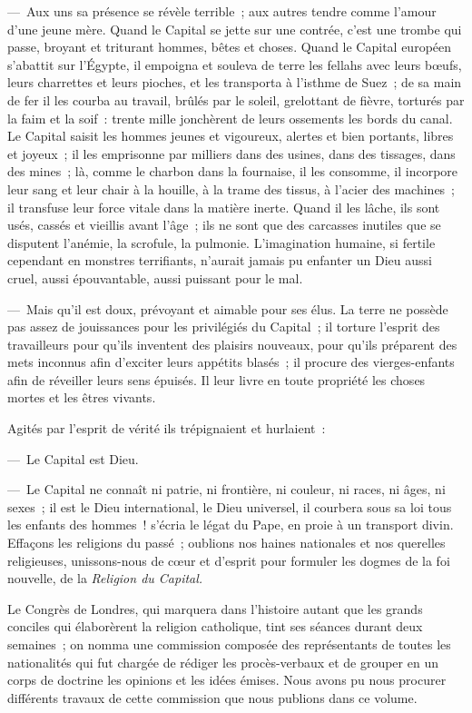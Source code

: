 \documentclass[french,twoside]{book} %
\begin{document}
— Aux uns sa présence se révèle terrible ; aux autres tendre comme l’amour d’une jeune mère. Quand le Capital se jette sur une contrée, c’est une trombe qui passe, broyant et triturant hommes, bêtes et choses. Quand le Capital européen s’abattit sur l’Égypte, il empoigna et souleva de terre les fellahs avec leurs bœufs, leurs charrettes et leurs pioches, et les transporta à l’isthme de Suez ; de sa main de fer il les courba au travail, brûlés par le soleil, grelottant de fièvre, torturés par la faim et la soif : trente mille jonchèrent de leurs ossements les bords du canal. Le Capital saisit les hommes jeunes et vigoureux, alertes et bien portants, libres et joyeux ; il les emprisonne par milliers dans des usines, dans des tissages, dans des mines ; là, comme le charbon dans la fournaise, il les consomme, il incorpore leur sang et leur chair à la houille, à la trame des tissus, à l’acier des machines ; il transfuse leur force vitale dans la matière inerte. Quand il les lâche, ils sont usés, cassés et vieillis avant l’âge ; ils ne sont que des carcasses inutiles que se disputent l’anémie, la scrofule, la pulmonie. L'imagination humaine, si fertile cependant en monstres terrifiants, n’aurait jamais pu enfanter un Dieu aussi cruel, aussi épouvantable, aussi puissant pour le mal.\par
— Mais qu’il est doux, prévoyant et aimable pour ses élus. La terre ne possède pas assez de jouissances pour les privilégiés du Capital ; il torture l’esprit des travailleurs pour qu’ils inventent des plaisirs nouveaux, pour qu’ils préparent des mets inconnus afin d’exciter leurs appétits blasés ; il procure des vierges-enfants afin de réveiller leurs sens épuisés. Il leur livre en toute propriété les choses mortes et les êtres vivants.\par
Agités par l’esprit de vérité ils trépignaient et hurlaient :\par
— Le Capital est Dieu.\par
— Le Capital ne connaît ni patrie, ni frontière, ni couleur, ni races, ni âges, ni sexes ; il est le Dieu international, le Dieu universel, il courbera sous sa loi tous les enfants des hommes ! s’écria le légat du Pape, en proie à un transport divin. Effaçons les religions du passé ; oublions nos haines nationales et nos querelles religieuses, unissons-nous de cœur et d’esprit pour formuler les dogmes de la foi nouvelle, de la \emph{Religion du Capital.}\par
Le Congrès de Londres, qui marquera dans l’histoire autant que les grands conciles qui élaborèrent la religion catholique, tint ses séances durant deux semaines ; on nomma une commission composée des représentants de toutes les nationalités qui fut chargée de rédiger les procès-verbaux et de grouper en un corps de doctrine les opinions et les idées émises. Nous avons pu nous procurer différents travaux de cette commission que nous publions dans ce volume.
\end{document}
